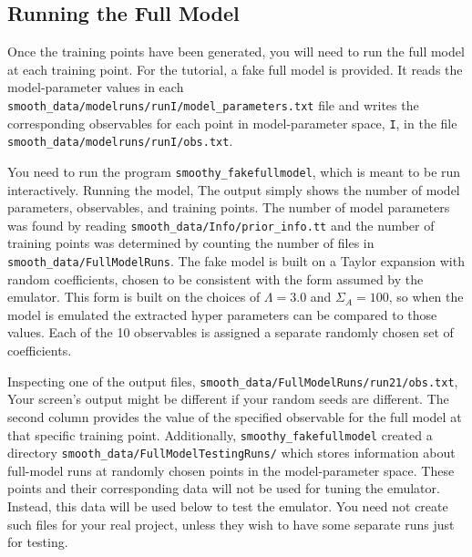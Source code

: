\documentclass[UserManual.tex]{subfiles}
\begin{document}
\begin{sloppypar}
\subsection{Running the Full Model}
Once the training points have been generated, you will need to run the full model at each training point. For the tutorial, a fake full model is provided. It reads the model-parameter values in each {\tt smooth\_data/modelruns/runI/model\_parameters.txt} file and writes the corresponding observables for each point in model-parameter space, {\tt I}, in the file {\tt smooth\_data/modelruns/runI/obs.txt}.

You need to run the program {\tt smoothy\_fakefullmodel}, which is meant to be run interactively. Running the model, 
\vspace*{-8pt}
The output simply shows the number of model parameters, observables, and training points. The number of model parameters was found by reading {\tt smooth\_data/Info/prior\_info.tt} and the number of training points was determined by counting the number of files in {\tt smooth\_data/FullModelRuns}. The fake model is built on a Taylor expansion with random coefficients, chosen to be consistent with the form assumed by the emulator. This form is built on the choices of $\Lambda=3.0$ and $\Sigma_A=100$, so when the model is emulated the extracted hyper parameters can be compared to those values. Each of the 10 observables is assigned a separate randomly chosen set of coefficients.

Inspecting one of the output files, {\tt smooth\_data/FullModelRuns/run21/obs.txt},
\vspace*{-8pt}{\tt \begin{Verbatim}[commandchars=\\\{\}]
obs0 4.400155
obs1 -21.571182
obs2 77.834125
obs3 -90.449334
obs4 81.835445
obs5 109.049434
obs6 158.438724
obs7 35.845752
obs8 15.825137
obs9 117.629489
\end{Verbatim}
}\vspace*{-8pt}
Your screen's output might be different if your random seeds are different. The second column provides the value of the specified observable for the full model at that specific training point. Additionally, {\tt smoothy\_fakefullmodel} created a directory {\tt smooth\_data/FullModelTestingRuns/} which stores information about full-model runs at randomly chosen points in the model-parameter space. These points and their corresponding data will not be used for tuning the emulator. Instead, this data will be used below to test the emulator. You need not create such files for your real project, unless they wish to have some separate runs just for testing. 


\end{sloppypar}
\end{document}

